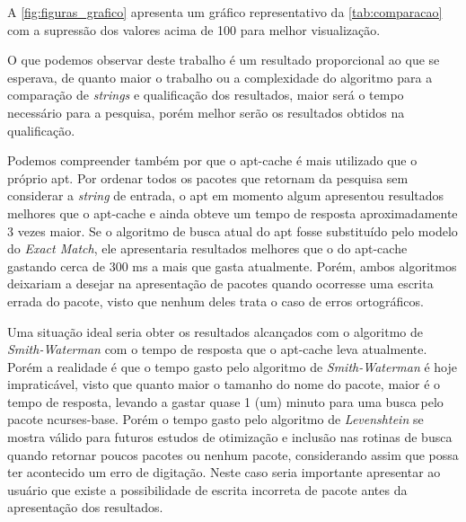 A \autoref{fig:figuras_grafico} apresenta um gráfico representativo da \autoref{tab:comparacao} com a supressão dos valores acima de 100  para melhor visualização.

O que podemos observar deste trabalho é um resultado proporcional ao que se esperava, de quanto maior o trabalho ou a complexidade do algoritmo para a comparação de \textit{strings} e qualificação dos resultados, maior será o tempo necessário para a pesquisa, porém melhor serão os resultados obtidos na qualificação.

Podemos compreender também por que o {\code apt-cache} é mais utilizado que o próprio {\code apt}. Por ordenar todos os pacotes que retornam da pesquisa sem considerar a \textit{string} de entrada, o {\code apt} em momento algum apresentou resultados melhores que o {\code apt-cache} e ainda obteve um tempo de resposta aproximadamente 3 vezes maior. Se o algoritmo de busca atual do {\code apt} fosse substituído pelo modelo do \textit{Exact Match}, ele apresentaria resultados melhores que o do {\code apt-cache} gastando cerca de $300$ ms a mais que gasta atualmente. Porém, ambos algoritmos deixariam a desejar na apresentação de pacotes quando ocorresse uma escrita errada do pacote, visto que nenhum deles trata o caso de erros ortográficos.

Uma situação ideal seria obter os resultados alcançados com o algoritmo de \textit{Smith-Waterman} com o tempo de resposta que o {\code apt-cache} leva atualmente. Porém a realidade é que o tempo gasto pelo algoritmo de \textit{Smith-Waterman} é hoje impraticável, visto que quanto maior o tamanho do nome do pacote, maior é o tempo de resposta, levando a gastar quase 1 (um) minuto para uma busca pelo pacote {\code ncurses-base}. Porém o tempo gasto pelo algoritmo de 
\textit{Levenshtein} se mostra válido para futuros estudos de otimização e inclusão nas rotinas de busca quando retornar poucos pacotes ou nenhum pacote, considerando assim que possa ter acontecido um erro de digitação. Neste caso seria importante apresentar ao usuário que existe a possibilidade de escrita incorreta de pacote antes da apresentação dos resultados.


